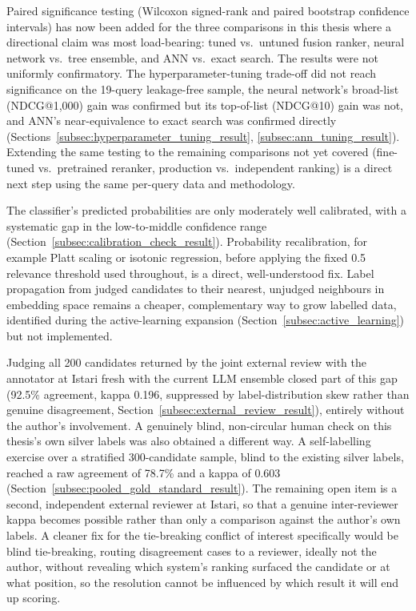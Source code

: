 \documentclass[a4paper,oneside,bibliography=totoc]{scrbook}
\begin{document}
Paired significance testing (Wilcoxon signed-rank and paired bootstrap confidence intervals) has now been added for the three comparisons in this thesis where a directional claim was most load-bearing: tuned vs.\ untuned fusion ranker, neural network vs.\ tree ensemble, and ANN vs.\ exact search. The results were not uniformly confirmatory. The hyperparameter-tuning trade-off did not reach significance on the 19-query leakage-free sample, the neural network's broad-list (NDCG@1{,}000) gain was confirmed but its top-of-list (NDCG@10) gain was not, and ANN's near-equivalence to exact search was confirmed directly (Sections~\ref{subsec:hyperparameter_tuning_result}, \ref{subsec:ann_tuning_result}). Extending the same testing to the remaining comparisons not yet covered (fine-tuned vs.\ pretrained reranker, production vs.\ independent ranking) is a direct next step using the same per-query data and methodology.

The classifier's predicted probabilities are only moderately well calibrated, with a systematic gap in the low-to-middle confidence range (Section~\ref{subsec:calibration_check_result}). Probability recalibration, for example Platt scaling or isotonic regression, before applying the fixed 0.5 relevance threshold used throughout, is a direct, well-understood fix. Label propagation from judged candidates to their nearest, unjudged neighbours in embedding space \citep{zhu2002labelpropagation} remains a cheaper, complementary way to grow labelled data, identified during the active-learning expansion (Section~\ref{subsec:active_learning}) but not implemented.

Judging all 200 candidates returned by the joint external review with the annotator at Istari fresh with the current LLM ensemble closed part of this gap (92.5\% agreement, kappa 0.196, suppressed by label-distribution skew rather than genuine disagreement, Section~\ref{subsec:external_review_result}), entirely without the author's involvement. A genuinely blind, non-circular human check on this thesis's own silver labels was also obtained a different way. A self-labelling exercise over a stratified 300-candidate sample, blind to the existing silver labels, reached a raw agreement of 78.7\% and a kappa of 0.603 (Section~\ref{subsec:pooled_gold_standard_result}). The remaining open item is a second, independent external reviewer at Istari, so that a genuine inter-reviewer kappa becomes possible rather than only a comparison against the author's own labels. A cleaner fix for the tie-breaking conflict of interest specifically would be blind tie-breaking, routing disagreement cases to a reviewer, ideally not the author, without revealing which system's ranking surfaced the candidate or at what position, so the resolution cannot be influenced by which result it will end up scoring.
\end{document}
